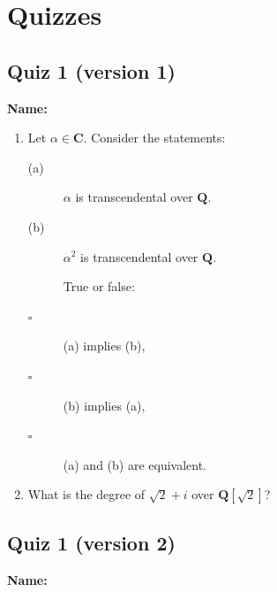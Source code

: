 \documentclass[11pt]{article}
\begin{document}
\section{Quizzes}
\label{sec:org802dc08}
\subsection{Quiz 1 (version 1)}
\label{sec:org793738c}
\textbf{Name:}

\vspace{1cm}

\begin{enumerate}
\item Let \(\alpha \in \mathbf{C}\).
Consider the statements:
\begin{description}
\item[{(a)}] \(\alpha\) is transcendental over \(\mathbf{Q}\).
\item[{(b)}] \(\alpha^2\) is transcendental over \(\mathbf{Q}\).

True or false:
\item[{$\square$}] (a) implies (b),
\item[{$\square$}] (b) implies (a),
\item[{$\square$}] (a) and (b) are equivalent.
\end{description}

\vspace{5cm}

\item What is the degree of \(\sqrt  2 + i\) over \(\mathbf{Q}[\sqrt 2]\)?
\end{enumerate}
\subsection{Quiz 1 (version 2)}
\label{sec:org38afa80}
\noindent
\textbf{Name:}

\bigskip
\end{document}
